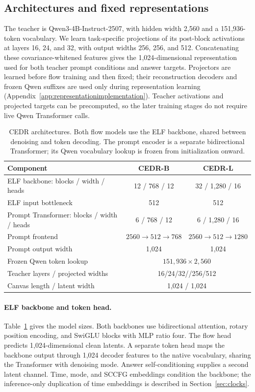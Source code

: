 \documentclass[11pt,letterpaper]{article}
\begin{document}
\subsection{Architectures and fixed representations}
\label{app:architecture}

The teacher is Qwen3-4B-Instruct-2507, with hidden width 2,560 and a 151,936-token vocabulary. We learn task-specific projections of its post-block activations at layers 16, 24, and 32, with output widths 256, 256, and 512. Concatenating these covariance-whitened features gives the 1,024-dimensional representation used for both teacher prompt conditions and answer targets. Projectors are learned before flow training and then fixed; their reconstruction decoders and frozen Qwen suffixes are used only during representation learning (Appendix~\ref{app:representationimplementation}). Teacher activations and projected targets can be precomputed, so the later training stages do not require live Qwen Transformer calls.

\begin{table}[!htb]
\centering\small
\setlength{\tabcolsep}{7pt}
\caption{CEDR architectures. Both flow models use the ELF backbone, shared between denoising and token decoding. The prompt encoder is a separate bidirectional Transformer; its Qwen vocabulary lookup is frozen from initialization onward.}
\label{tab:architectures}
\begin{tabular}{@{}lcc@{}}
\toprule
Component & CEDR-B & CEDR-L\\
\midrule
ELF backbone: blocks / width / heads & 12 / 768 / 12 & 32 / 1,280 / 16\\
ELF input bottleneck & 512 & 512\\
Prompt Transformer: blocks / width / heads & 6 / 768 / 12 & 6 / 1,280 / 16\\
Prompt frontend & $2560\to512\to768$ & $2560\to512\to1280$\\
Prompt output width & 1,024 & 1,024\\
Frozen Qwen token lookup & \multicolumn{2}{c}{$151{,}936\times2{,}560$}\\
Teacher layers / projected widths & \multicolumn{2}{c}{16/24/32\quad /\quad 256/256/512}\\
Canvas length / latent width & \multicolumn{2}{c}{1,024 / 1,024}\\
\bottomrule
\end{tabular}
\end{table}

\paragraph{ELF backbone and token head.}
Table~\ref{tab:architectures} gives the model sizes. Both backbones use bidirectional attention, rotary position encoding, and SwiGLU blocks with MLP ratio four. The flow head predicts 1,024-dimensional clean latents. A separate token head maps the backbone output through 1,024 decoder features to the native vocabulary, sharing the Transformer with denoising mode. Answer self-conditioning supplies a second latent channel. Time, mode, and SCCFG embeddings condition the backbone; the inference-only duplication of time embeddings is described in Section~\ref{sec:clocks}.
\end{document}

